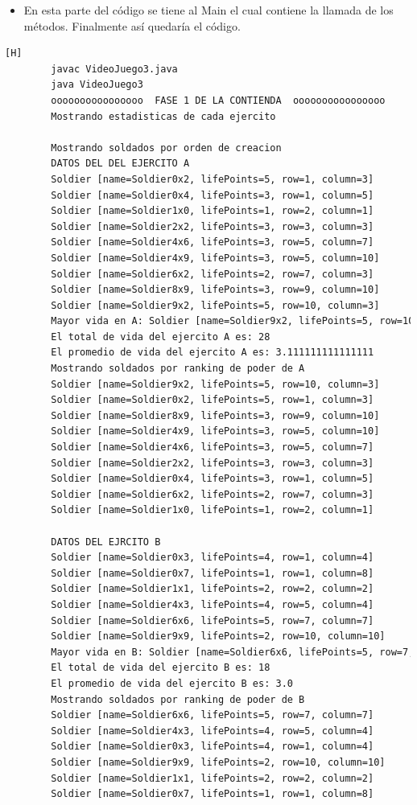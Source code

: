 \documentclass{article}
\begin{document}
	\begin{itemize}	
		\item En esta parte del código se tiene al Main el cual contiene la llamada de los métodos. Finalmente así quedaría el código.
	\end{itemize}
	
	
	\begin{lstlisting}[language=bash,caption={Compilando y probando el codigo en su versión final }][H]
		javac VideoJuego3.java
		java VideoJuego3
		oooooooooooooooo  FASE 1 DE LA CONTIENDA  oooooooooooooooo
		Mostrando estadisticas de cada ejercito
		
		Mostrando soldados por orden de creacion
		DATOS DEL DEL EJERCITO A
		Soldier [name=Soldier0x2, lifePoints=5, row=1, column=3]
		Soldier [name=Soldier0x4, lifePoints=3, row=1, column=5]
		Soldier [name=Soldier1x0, lifePoints=1, row=2, column=1]
		Soldier [name=Soldier2x2, lifePoints=3, row=3, column=3]
		Soldier [name=Soldier4x6, lifePoints=3, row=5, column=7]
		Soldier [name=Soldier4x9, lifePoints=3, row=5, column=10]
		Soldier [name=Soldier6x2, lifePoints=2, row=7, column=3]
		Soldier [name=Soldier8x9, lifePoints=3, row=9, column=10]
		Soldier [name=Soldier9x2, lifePoints=5, row=10, column=3]
		Mayor vida en A: Soldier [name=Soldier9x2, lifePoints=5, row=10, column=3]
		El total de vida del ejercito A es: 28
		El promedio de vida del ejercito A es: 3.111111111111111
		Mostrando soldados por ranking de poder de A
		Soldier [name=Soldier9x2, lifePoints=5, row=10, column=3]
		Soldier [name=Soldier0x2, lifePoints=5, row=1, column=3]
		Soldier [name=Soldier8x9, lifePoints=3, row=9, column=10]
		Soldier [name=Soldier4x9, lifePoints=3, row=5, column=10]
		Soldier [name=Soldier4x6, lifePoints=3, row=5, column=7]
		Soldier [name=Soldier2x2, lifePoints=3, row=3, column=3]
		Soldier [name=Soldier0x4, lifePoints=3, row=1, column=5]
		Soldier [name=Soldier6x2, lifePoints=2, row=7, column=3]
		Soldier [name=Soldier1x0, lifePoints=1, row=2, column=1]
		
		DATOS DEL EJRCITO B
		Soldier [name=Soldier0x3, lifePoints=4, row=1, column=4]
		Soldier [name=Soldier0x7, lifePoints=1, row=1, column=8]
		Soldier [name=Soldier1x1, lifePoints=2, row=2, column=2]
		Soldier [name=Soldier4x3, lifePoints=4, row=5, column=4]
		Soldier [name=Soldier6x6, lifePoints=5, row=7, column=7]
		Soldier [name=Soldier9x9, lifePoints=2, row=10, column=10]
		Mayor vida en B: Soldier [name=Soldier6x6, lifePoints=5, row=7, column=7]
		El total de vida del ejercito B es: 18
		El promedio de vida del ejercito B es: 3.0
		Mostrando soldados por ranking de poder de B
		Soldier [name=Soldier6x6, lifePoints=5, row=7, column=7]
		Soldier [name=Soldier4x3, lifePoints=4, row=5, column=4]
		Soldier [name=Soldier0x3, lifePoints=4, row=1, column=4]
		Soldier [name=Soldier9x9, lifePoints=2, row=10, column=10]
		Soldier [name=Soldier1x1, lifePoints=2, row=2, column=2]
		Soldier [name=Soldier0x7, lifePoints=1, row=1, column=8]
		

\end{lstlisting}
\end{document}

